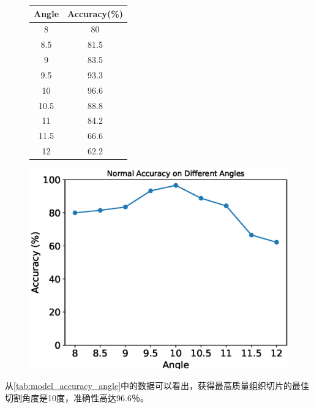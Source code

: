 \begin{figure}[H]
    \centering
    \begin{minipage}{0.4\textwidth}
        \centering
        \begin{tabular}{cc}
            \toprule
            Angle & Accuracy(\%) \\
            \midrule
            8 & 80 \\
            8.5 & 81.5 \\
            9 & 83.5 \\
            9.5 & 93.3 \\
            10 & 96.6 \\
            10.5 & 88.8 \\
            11 & 84.2 \\
            11.5 & 66.6 \\
            12 & 62.2 \\
            \bottomrule
        \end{tabular}
        \label{tab:model_accuracy_angle}
    \end{minipage}
    \begin{minipage}{0.55\textwidth}
        \centering
        \includegraphics[width=\textwidth]{./fig/assistplot/angle_accuracy.eps}
        \label{fig:angle_accuracy_histogram}
    \end{minipage}
\end{figure}

从\autoref{tab:model_accuracy_angle}中的数据可以看出，获得最高质量组织切片的最佳切割角度是10度，准确性高达96.6％。

